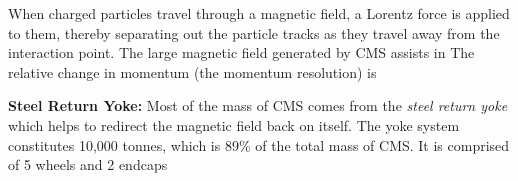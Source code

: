 When charged particles travel through a magnetic field, a Lorentz force is applied to them, thereby separating out the particle tracks as they travel away from the interaction point.
The large magnetic field generated by CMS assists in The relative change in momentum (\ie the momentum resolution) is 

\textbf{Steel Return Yoke:} 
Most of the mass of CMS comes from the \emph{steel return yoke} which helps to redirect the magnetic field back on itself. 
The yoke system constitutes 10,000 tonnes, which is 89\% of the total mass of CMS.
It is comprised of 5 wheels and 2 endcaps
